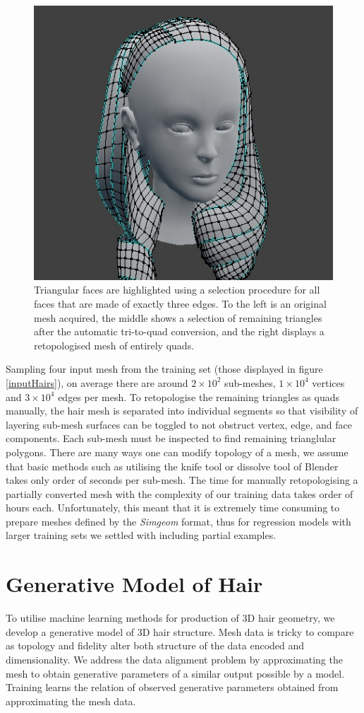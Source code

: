 \documentclass[ %
author={Dillon Keith Diep},
supervisor={Dr. Carl Henrik Ek},
degree={MEng},
title={ART-CG:},
subtitle={Assisted Real-time Content Generation of 3D Hair by Learning Manifolds},
type={Research},
year={2017} ]{dissertation}
\begin{document}
\begin{figure}[!h]
	\includegraphics[scale=2]{images/triToQuad3}
	\caption{Triangular faces are highlighted using a selection procedure for all faces that are made of exactly three edges. To the left is an original mesh acquired, the middle shows a selection of remaining triangles after the automatic tri-to-quad conversion, and the right displays a retopologised mesh of entirely quads.}
\end{figure}

Sampling four input mesh from the training set (those displayed in figure \ref{inputHairs}), on average there are around $2 \times 10^{2}$ sub-meshes, $1 \times 10^{4}$ vertices and  $3 \times 10^{4}$ edges per mesh. To retopologise the remaining triangles as quads manually, the hair mesh is separated into individual segments so that visibility of layering sub-mesh surfaces can be toggled to not obstruct vertex, edge, and face components. Each sub-mesh must be inspected to find remaining trianglular polygons. There are many ways one can modify topology of a mesh, we assume that basic methods such as utilising the knife tool or dissolve tool of Blender takes only order of seconds per sub-mesh. The time for manually retopologising a partially converted mesh with the complexity of our training data takes order of hours each. Unfortunately, this meant that it is extremely time consuming to prepare meshes defined by the \textit{Simgeom} format, thus for regression models with larger training sets we settled with including partial examples.

\section{Generative Model of Hair}
To utilise machine learning methods for production of 3D hair geometry,  we develop a generative model of 3D hair structure. Mesh data is tricky to compare as topology and fidelity alter both structure of the data encoded and dimensionality. We address the data alignment problem by approximating the mesh to obtain generative parameters of a similar output possible by a model. Training learns the relation of observed generative parameters obtained from approximating the mesh data.
\end{document}
